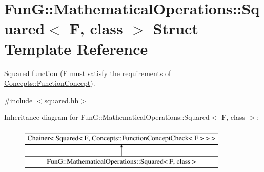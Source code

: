 \hypertarget{structFunG_1_1MathematicalOperations_1_1Squared}{}\section{Fun\+G\+:\+:Mathematical\+Operations\+:\+:Squared$<$ F, class $>$ Struct Template Reference}
\label{structFunG_1_1MathematicalOperations_1_1Squared}


Squared function (F must satisfy the requirements of \hyperlink{structFunG_1_1Concepts_1_1FunctionConcept}{Concepts\+::\+Function\+Concept}).  




{\ttfamily \#include $<$squared.\+hh$>$}

Inheritance diagram for Fun\+G\+:\+:Mathematical\+Operations\+:\+:Squared$<$ F, class $>$\+:\begin{figure}[H]
\begin{center}
\leavevmode
\includegraphics[height=2.000000cm]{structFunG_1_1MathematicalOperations_1_1Squared}
\end{center}
\end{figure}
